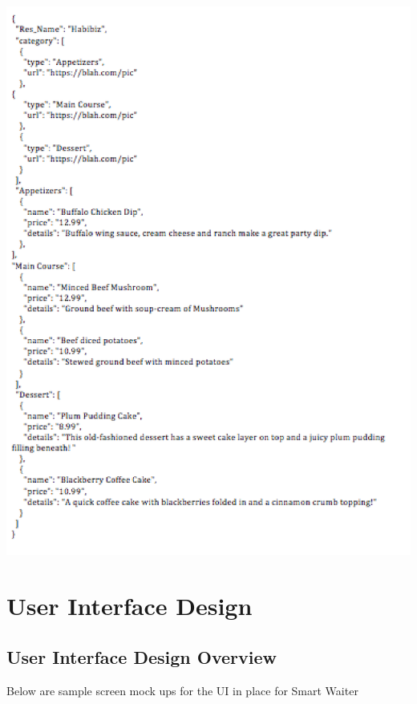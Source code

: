 \documentclass[12pt, titlepage]{article}
\begin{document}
\includegraphics[width=150mm,scale=0.5]{JSONdata.png}


\section{User Interface Design}

\subsection{User Interface Design Overview}
Below are sample screen mock ups for the UI in place for Smart Waiter
\end{document}
